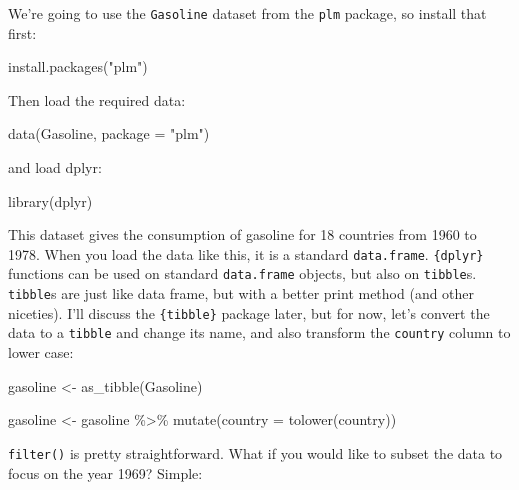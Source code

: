 \documentclass[
]{article}
\newenvironment{Shaded}{\begin{snugshade}}{\end{snugshade}}
\newcommand{\AttributeTok}[1]{\textcolor[rgb]{0.77,0.63,0.00}{#1}}
\newcommand{\FunctionTok}[1]{\textcolor[rgb]{0.00,0.00,0.00}{#1}}
\newcommand{\NormalTok}[1]{#1}
\newcommand{\OtherTok}[1]{\textcolor[rgb]{0.56,0.35,0.01}{#1}}
\newcommand{\SpecialCharTok}[1]{\textcolor[rgb]{0.00,0.00,0.00}{#1}}
\newcommand{\StringTok}[1]{\textcolor[rgb]{0.31,0.60,0.02}{#1}}
\begin{document}
We're going to use the \texttt{Gasoline} dataset from the \texttt{plm} package, so install that first:

\begin{Shaded}
\begin{Highlighting}[]
\FunctionTok{install.packages}\NormalTok{(}\StringTok{"plm"}\NormalTok{)}
\end{Highlighting}
\end{Shaded}

Then load the required data:

\begin{Shaded}
\begin{Highlighting}[]
\FunctionTok{data}\NormalTok{(Gasoline, }\AttributeTok{package =} \StringTok{"plm"}\NormalTok{)}
\end{Highlighting}
\end{Shaded}

and load dplyr:

\begin{Shaded}
\begin{Highlighting}[]
\FunctionTok{library}\NormalTok{(dplyr)}
\end{Highlighting}
\end{Shaded}

This dataset gives the consumption of gasoline for 18 countries from 1960 to 1978. When you load
the data like this, it is a standard \texttt{data.frame}. \texttt{\{dplyr\}} functions can be used on standard
\texttt{data.frame} objects, but also on \texttt{tibble}s. \texttt{tibble}s are just like data frame, but with a better
print method (and other niceties). I'll discuss the \texttt{\{tibble\}} package later, but for now, let's
convert the data to a \texttt{tibble} and change its name, and also transform the \texttt{country} column to
lower case:

\begin{Shaded}
\begin{Highlighting}[]
\NormalTok{gasoline }\OtherTok{\textless{}{-}} \FunctionTok{as\_tibble}\NormalTok{(Gasoline)}

\NormalTok{gasoline }\OtherTok{\textless{}{-}}\NormalTok{ gasoline }\SpecialCharTok{\%\textgreater{}\%}
  \FunctionTok{mutate}\NormalTok{(}\AttributeTok{country =} \FunctionTok{tolower}\NormalTok{(country))}
\end{Highlighting}
\end{Shaded}

\texttt{filter()} is pretty straightforward. What if you would like to subset the data to focus on the
year 1969? Simple:
\end{document}
